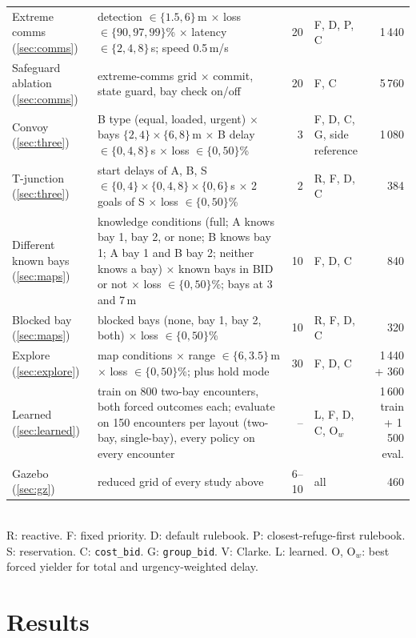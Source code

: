 \documentclass[letterpaper,journal]{IEEEtran}
\newcommand{\cb}{\texttt{cost\_bid}}
\newcommand{\gb}{\texttt{group\_bid}}
\begin{document}
\begin{table}[t]
{\begin{tabular}{@{}>{\raggedright\arraybackslash}p{}>{\raggedright\arraybackslash}p{}r>{\raggedright\arraybackslash}p{}r@{}}
Extreme comms (\ref{sec:comms}) & detection $\in\{1.5,6\}$\,m $\times$ loss $\in\{90,97,99\}$\% $\times$ latency $\in\{2,4,8\}$\,s; speed 0.5\,m/s & 20 & F, D, P, C & 1\,440\\
Safeguard ablation (\ref{sec:comms}) & extreme-comms grid $\times$ commit, state guard, bay check on/off & 20 & F, C & 5\,760\\
Convoy (\ref{sec:three}) & B type (equal, loaded, urgent) $\times$ bays $\{2,4\}\times\{6,8\}$\,m $\times$ B delay $\in\{0,4,8\}$\,s $\times$ loss $\in\{0,50\}$\% & 3 & F, D, C, G, side reference & 1\,080\\
T-junction (\ref{sec:three}) & start delays of A, B, S $\in\{0,4\}\times\{0,4,8\}\times\{0,6\}$\,s $\times$ 2 goals of S $\times$ loss $\in\{0,50\}$\% & 2 & R, F, D, C & 384\\
Different known bays (\ref{sec:maps}) & 7 knowledge conditions (full; A knows bay 1, bay 2, or none; B knows bay 1; A bay 1 and B bay 2; neither knows a bay) $\times$ known bays in BID or not $\times$ loss $\in\{0,50\}$\%; bays at 3 and 7\,m & 10 & F, D, C & 840\\
Blocked bay (\ref{sec:maps}) & blocked bays (none, bay 1, bay 2, both) $\times$ loss $\in\{0,50\}$\% & 10 & R, F, D, C & 320\\
Explore (\ref{sec:explore}) & 4 map conditions $\times$ range $\in\{6,3.5\}$\,m $\times$ loss $\in\{0,50\}$\%; plus hold mode & 30 & F, D, C & 1\,440 + 360\\
Learned (\ref{sec:learned}) & train on 800 two-bay encounters, both forced outcomes each; evaluate on 150 encounters per layout (two-bay, single-bay), every policy on every encounter & -- & L, F, D, C, O$_w$ & 1\,600 train + 1\,500 eval.\\
Gazebo (\ref{sec:gz}) & reduced grid of every study above & 6--10 & all & 460\\\bottomrule
\end{tabular}}\\[2pt]
{\footnotesize R: reactive. F: fixed priority. D: default rulebook. P: closest-refuge-first rulebook. S: reservation. C: \cb. G: \gb. V: Clarke. L: learned. O, O$_w$: best forced yielder for total and urgency-weighted delay.}
\end{table}

\section{Results}
\end{document}
